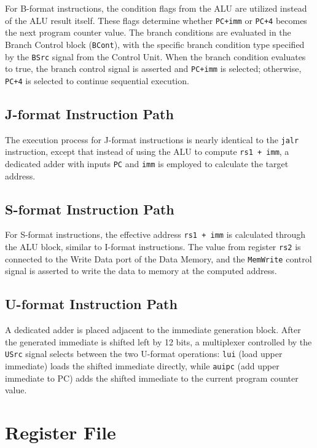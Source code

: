 \documentclass{article}
\begin{document}
For B-format instructions, the condition flags from the ALU are utilized instead of the ALU result itself. These flags determine whether \texttt{PC+imm} or \texttt{PC+4} becomes the next program counter value. The branch conditions are evaluated in the Branch Control block (\texttt{BCont}), with the specific branch condition type specified by the \texttt{BSrc} signal from the Control Unit. When the branch condition evaluates to true, the branch control signal is asserted and \texttt{PC+imm} is selected; otherwise, \texttt{PC+4} is selected to continue sequential execution.

\subsection*{J-format Instruction Path}

The execution process for J-format instructions is nearly identical to the \texttt{jalr} instruction, except that instead of using the ALU to compute \texttt{rs1 + imm}, a dedicated adder with inputs \texttt{PC} and \texttt{imm} is employed to calculate the target address.

\subsection*{S-format Instruction Path}

For S-format instructions, the effective address \texttt{rs1 + imm} is calculated through the ALU block, similar to I-format instructions. The value from register \texttt{rs2} is connected to the Write Data port of the Data Memory, and the \texttt{MemWrite} control signal is asserted to write the data to memory at the computed address.

\subsection*{U-format Instruction Path}

A dedicated adder is placed adjacent to the immediate generation block. After the generated immediate is shifted left by 12 bits, a multiplexer controlled by the \texttt{USrc} signal selects between the two U-format operations: \texttt{lui} (load upper immediate) loads the shifted immediate directly, while \texttt{auipc} (add upper immediate to PC) adds the shifted immediate to the current program counter value.

\section{Register File}
\end{document}
